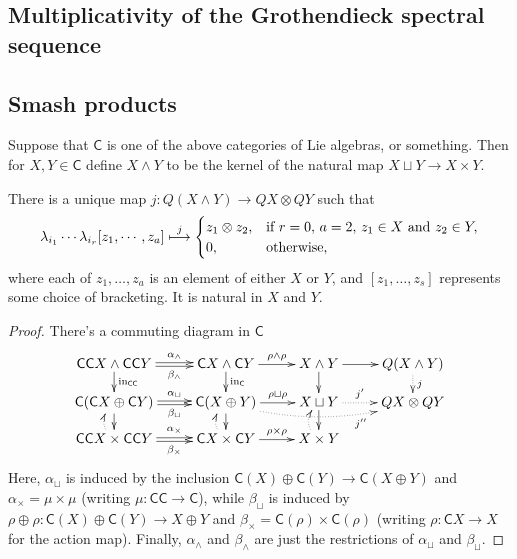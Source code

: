 \documentclass[10pt]{article}
\begin{document}
\begin{Grothendieck Multiplicativity}
\section{Multiplicativity of the Grothendieck spectral sequence}
\subsection{Smash products}
Suppose that $\mathsf{C}$ is one of the above categories of Lie algebras, or something. Then for $X,Y\in\mathsf{C}$ define $X\wedge Y$ to be the kernel of the natural map $X\sqcup Y\to X\times Y$. 
\begin{prop}
There is a unique map $j:Q(X\wedge Y)\to QX\otimes QY$ such that
\[\lambda_{i_1}\cdots \lambda_{i_r}[z_1,\cdots ,z_a]\overset{j}{\mapsto}\begin{cases}
z_1\otimes z_2,&\textup{if }r=0,\,a=2,\,z_1\in X\textup{ and } z_2\in Y,
\\0,&\textup{otherwise, }
\end{cases}
\]
where each of $z_1,\ldots,z_a$ is an element of either $X$ or $Y$, and $[z_1,\ldots,z_s]$ represents some choice of bracketing. It is natural in $X$ and $Y$.
\end{prop}
\begin{proof}
There's a commuting diagram in $\mathsf{C}$
\[\xymatrix@R=4mm{
\mathsf{C}\mathsf{C}X\wedge \mathsf{C}\mathsf{C}Y
\ar[d]^-{\textup{in}_{\mathsf{C}\mathsf{C}}}
\ar@<.3ex>[r]^-{\alpha_{\wedge }}
\ar@<-.3ex>[r]_-{\beta_{\wedge }}
&%
\mathsf{C}X\wedge \mathsf{C}Y
\ar[d]^-{\textup{in}_{\mathsf{C}}}
\ar[r]^-{\rho\wedge \rho}
&%
X\wedge Y
\ar[d]%
\ar[r]
&
Q(X\wedge Y)
\ar@{..>}[d]^-{j}
\\
\mathsf{C}(\mathsf{C}X\oplus\mathsf{C}Y)
\ar[d]
\ar@<.3ex>[r]^-{\alpha_{\sqcup}}
\ar@<-.3ex>[r]_-{\beta_{\sqcup}}
&%
\mathsf{C}(X\oplus Y)
\ar@{..>}@/_1em/[rr]_-(.85){j''}
\ar[d]
\ar[r]^-{\rho\sqcup \rho}
&%
X\sqcup Y
\ar[d]
\ar@{..>}[r]^-{j'}
&
QX\otimes QY
\\
\mathsf{C}\mathsf{C}X\times \mathsf{C}\mathsf{C}Y
\ar@<.3ex>[r]^-{\alpha_{\times}}
\ar@<-.3ex>[r]_-{\beta_{\times}}
\ar@{..>}@/^.75em/@<0ex>[u]
&%
\mathsf{C}X\times \mathsf{C}Y
\ar[r]^-{\rho\times \rho}
\ar@{..>}@/^.75em/@<0ex>[u]
&%
X\times Y
\ar@{..>}@/^.75em/@<0ex>[u]
}\]
Here, $\alpha_{\sqcup}$ is induced by the inclusion $\mathsf{C}(X)\oplus\mathsf{C}(Y)\to\mathsf{C}(X\oplus Y)$ and $\alpha_{\times}=\mu\times\mu$ (writing $\mu:\mathsf{C}\mathsf{C}\to\mathsf{C}$), while $\beta_{\sqcup}$ is induced by $\rho\oplus\rho:\mathsf{C}(X)\oplus\mathsf{C}(Y)\to X\oplus Y$ and $\beta_{\times}=\mathsf{C}(\rho)\times\mathsf{C}(\rho)$ (writing $\rho:\mathsf{C}X\to X$ for the action map). Finally, $\alpha_{\wedge }$ and $\beta_{\wedge }$ are just the restrictions of $\alpha_{\sqcup }$ and $\beta_{\sqcup }$.


\end{proof}
\end{Grothendieck Multiplicativity}
\end{document}
